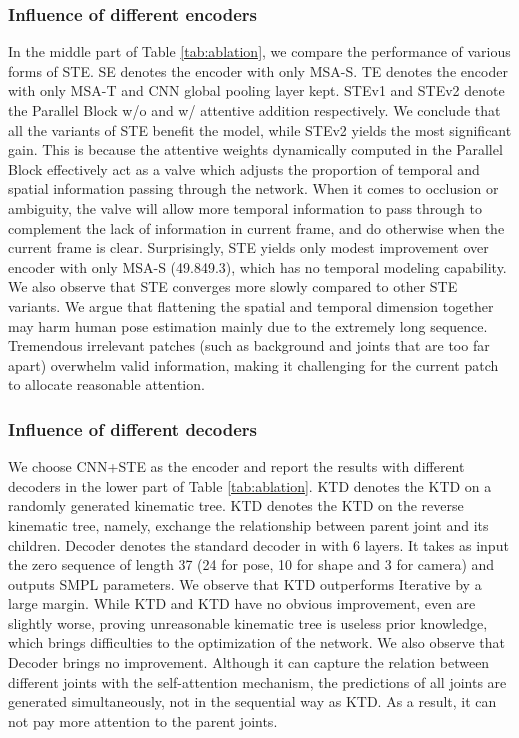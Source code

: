 \documentclass[10pt,twocolumn,letterpaper]{article}
\begin{document}
{{\subsubsection{Influence of different encoders} \label{ablation_ste}
In the middle part of Table \ref{tab:ablation}, we compare the performance of various forms of STE. SE denotes the encoder with only MSA-S. TE denotes the encoder with only MSA-T and CNN global pooling layer kept. STEv1 and STEv2 denote the Parallel Block w/o and w/ attentive addition respectively. We conclude that all the variants of STE benefit the model, while STEv2 yields the most significant gain. This is because the attentive weights dynamically computed
in the Parallel Block effectively act as a valve which adjusts the proportion of temporal and spatial information passing through the network.
When it comes to occlusion or ambiguity, the valve will allow more temporal information to pass through to complement the lack of information in current frame, and do otherwise when the current frame is clear. Surprisingly, STE yields only modest improvement over encoder with only MSA-S (49.849.3), which has no temporal modeling capability. We also observe that STE converges more slowly compared to other STE variants. We argue that flattening the spatial and temporal dimension together may harm human pose estimation mainly due to the extremely long sequence. 
Tremendous irrelevant patches (such as background and joints that are too far apart) 
overwhelm valid information, making it challenging for the current patch to allocate reasonable attention.


\subsubsection{Influence of different decoders} 
We choose CNN+STE as the encoder and report the results with different decoders in the lower part of Table \ref{tab:ablation}. KTD denotes the KTD on a randomly generated kinematic tree. KTD denotes the KTD on the reverse kinematic tree, namely, exchange the relationship between parent joint and its children. Decoder denotes the standard decoder in \cite{transformer} with 6 layers. It takes as input the zero sequence of length 37 (24 for pose, 10 for shape and 3 for camera) and outputs SMPL parameters. We observe that KTD outperforms Iterative by a large margin. While KTD and KTD have no obvious improvement, even are slightly worse, proving unreasonable kinematic tree is useless prior knowledge, which brings difficulties to the optimization of the network. We also observe that Decoder brings no improvement. Although it can capture the relation between different joints with the self-attention mechanism, the predictions of all joints are generated simultaneously, not in the sequential way as KTD. As a result, it can not pay more attention to the parent joints.





}}
\end{document}
